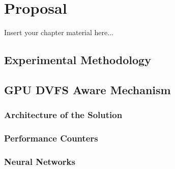 
\chapter{Proposal}
\label{chapter:implementation}

Insert your chapter material here...



\section{Experimental Methodology}

\section{GPU DVFS Aware Mechanism}
\label{section:solarch}


\subsection{Architecture of the Solution}
\label{section:solarch}

\subsection{Performance Counters}
\label{section:solarch}

\subsection{Neural Networks}
\label{section:solarch}